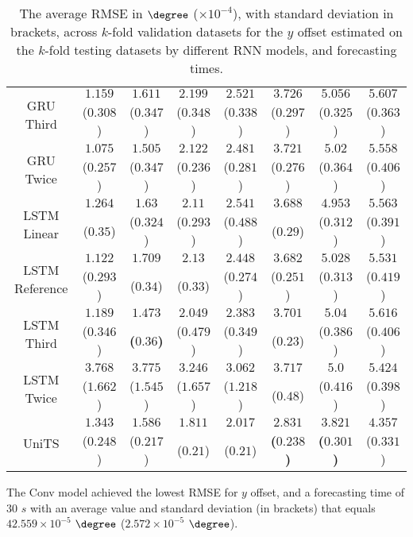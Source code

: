 \begin{table}[!ht]
{\begin{tabular}{|c|c|c|c|c|c|c|c|}
			\multirow{2}{*}{GRU Third} & $1.159$ & $1.611$ & $2.199$ & $2.521$ & $3.726$ & $5.056$ & $5.607$ \\
			 & ($0.308$) & ($0.347$) & ($0.348$) & ($0.338$) & ($0.297$) & ($0.325$) & ($0.363$) \\ \hline
			\multirow{2}{*}{GRU Twice} & $1.075$ & $1.505$ & $2.122$ & $2.481$ & $3.721$ & $5.02$ & $5.558$ \\
			 & ($0.257$) & ($0.347$) & ($0.236$) & ($0.281$) & ($0.276$) & ($0.364$) & ($0.406$) \\ \hline
			\multirow{2}{*}{LSTM Linear} & $1.264$ & $1.63$ & $2.11$ & $2.541$ & $3.688$ & $4.953$ & $5.563$ \\
			 & ($0.35$) & ($0.324$) & ($0.293$) & ($0.488$) & ($0.29$) & ($0.312$) & ($0.391$) \\ \hline
			\multirow{2}{*}{LSTM Reference} & $1.122$ & $1.709$ & $2.13$ & $2.448$ & $3.682$ & $5.028$ & $5.531$ \\
			 & ($0.293$) & ($0.34$) & ($0.33$) & ($0.274$) & ($0.251$) & ($0.313$) & ($0.419$) \\ \hline
			\multirow{2}{*}{LSTM Third} & $1.189$ & $\mathbf{1.473}$ & $2.049$ & $2.383$ & $3.701$ & $5.04$ & $5.616$ \\
			 & ($0.346$) & \textbf{(}$\mathbf{0.36}$\textbf{)} & ($0.479$) & ($0.349$) & ($0.23$) & ($0.386$) & ($0.406$) \\ \hline
			\multirow{2}{*}{LSTM Twice} & $3.768$ & $3.775$ & $3.246$ & $3.062$ & $3.717$ & $5.0$ & $5.424$ \\
			 & ($1.662$) & ($1.545$) & ($1.657$) & ($1.218$) & ($0.48$) & ($0.416$) & ($0.398$) \\ \hline
			\multirow{2}{*}{UniTS} & $1.343$ & $1.586$ & $1.811$ & $2.017$ & $\mathbf{2.831}$ & $\mathbf{3.821}$ & $4.357$ \\
			 & ($0.248$) & ($0.217$) & ($0.21$) & ($0.21$) & \textbf{(}$\mathbf{0.238}$\textbf{)} & \textbf{(}$\mathbf{0.301}$\textbf{)} & ($0.331$) \\ \hline
		\end{tabular}
	}
	\caption{The average RMSE in $\degree$ ($\times 10^{-4}$), with standard deviation in brackets, across $k$-fold validation datasets for the $y$ offset estimated on the $k$-fold testing datasets by different RNN models, and forecasting times.}
	\label{tab:wilcoxon_latitude_no_abs_RMSE}
\end{table}

The Conv model achieved the lowest RMSE for $y$ offset, and a forecasting time of $30$ $s$ with an average value and standard deviation (in brackets) that equals $42.559 \times 10^{-5}$ $\degree$ ($2.572 \times 10^{-5}$ $\degree$).


